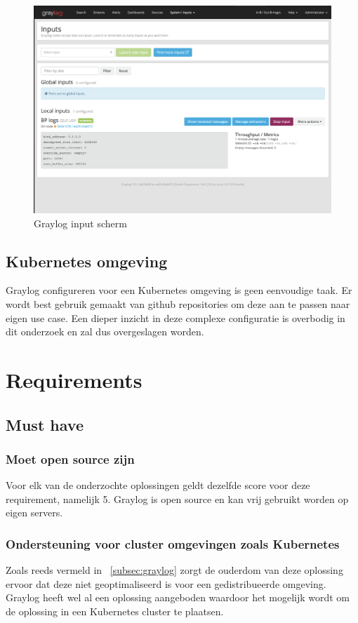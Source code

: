 \begin{figure}[ht]
    \centering
    \includegraphics[scale=0.35]{img/graylog_input}
    \caption[Graylog input sherm]{Graylog input scherm}
\end{figure}

\subsection{Kubernetes omgeving}
Graylog configureren voor een Kubernetes omgeving is geen eenvoudige taak. Er wordt best gebruik gemaakt van github repositories om deze aan te passen naar eigen use case. Een dieper inzicht in deze complexe configuratie is overbodig in dit onderzoek en zal dus overgeslagen worden.

\section{Requirements}

\subsection{Must have}
\subsubsection{Moet open source zijn}
Voor elk van de onderzochte oplossingen geldt dezelfde score voor deze requirement, namelijk 5. Graylog is open source en kan vrij gebruikt worden op eigen servers.

\subsubsection{Ondersteuning voor cluster omgevingen zoals Kubernetes}
Zoals reeds vermeld in ~\ref{subsec:graylog} zorgt de ouderdom van deze oplossing ervoor dat deze niet geoptimaliseerd is voor een gedistribueerde omgeving. Graylog heeft wel al een oplossing aangeboden waardoor het mogelijk wordt om de oplossing in een Kubernetes cluster te plaatsen. 

